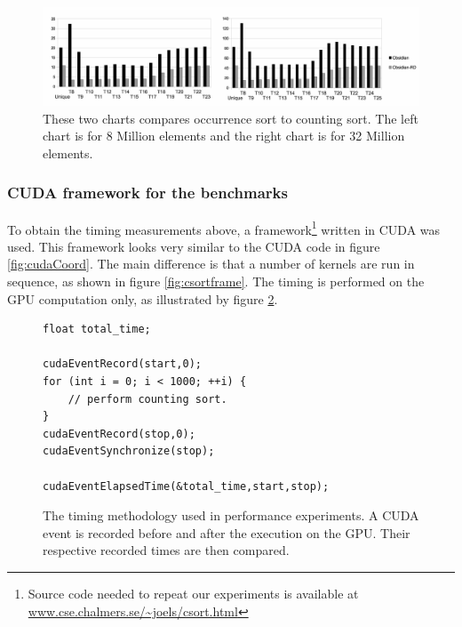 \begin{figure}
\includegraphics[width=\linewidth]{./csort/chart2}
\caption{These two charts compares occurrence sort to  counting sort. 
The left chart is for 8 Million elements and the right chart is 
for 32 Million elements.}
\label{fig:chart2}
\end{figure}



\subsubsection{CUDA framework for the benchmarks}


To obtain the timing measurements above, a 
framework\footnote{Source code needed to repeat our experiments is available at \url{www.cse.chalmers.se/~joels/csort.html}} 
written in CUDA was used. 
This framework looks very similar to the CUDA code in figure \ref{fig:cudaCoord}. 
The main difference is that a number of kernels are run in sequence, as 
shown in figure \ref{fig:csortframe}. The timing is performed on the GPU 
computation only, as illustrated by figure \ref{fig:timing}.

\begin{figure} 
\begin{small}
\begin{verbatim} 
float total_time;

cudaEventRecord(start,0);
for (int i = 0; i < 1000; ++i) { 
    // perform counting sort. 
}
cudaEventRecord(stop,0);
cudaEventSynchronize(stop);
   
cudaEventElapsedTime(&total_time,start,stop);
\end{verbatim}
\end{small}
\caption{The timing methodology used in performance experiments. A CUDA event 
is recorded before and after the execution on the GPU. Their respective recorded times
are then compared.}
\label{fig:timing}
\end{figure}




